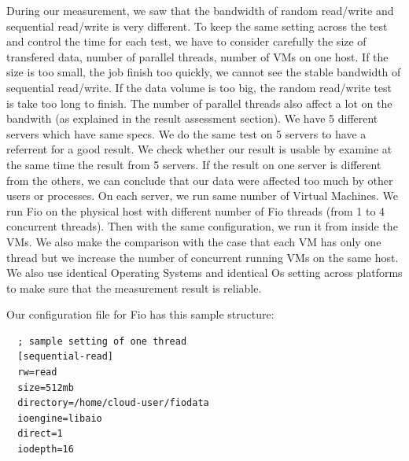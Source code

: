 \documentclass{acmsig}
\newcommand{\noteby}[2]{\todo[inline]{#2\hspace*{\fill}\mbox{ --#1}}}
\begin{document}
\noteby{sh}{Insert a figure here}

During our measurement, we saw that the bandwidth of random read/write and sequential read/write is very different. To keep the same setting across the test and control the time for each test, we have to consider carefully the size of transfered data, number of parallel threads, number of VMs on one host. If the size is too small, the job finish too quickly, we cannot see the stable bandwidth of sequential read/write. If the data volume is too big, the random read/write test is take too long to finish. The number of parallel threads also affect a lot on the bandwith (as explained in the result assessment section). We have 5 different servers which have same specs. We do the same test on 5 servers to have a referrent for a good result. We check whether our result is usable by examine at the same time the result from 5 servers. If the result on one server is different from the others, we can conclude that our data were affected too much by other users or processes. On each server, we run same number of Virtual Machines. We run Fio on the physical host with different number of Fio threads (from 1 to 4 concurrent threads). Then with the same configuration, we run it from inside the VMs. We also make the comparison with the case that each VM has only one thread but we increase the number of concurrent running VMs on the same host. We also use identical Operating Systems and identical Os setting across platforms to make sure that the measurement result is reliable.

Our configuration file for Fio has this sample structure:
\begin{lstlisting}
  ; sample setting of one thread
  [sequential-read]
  rw=read
  size=512mb
  directory=/home/cloud-user/fiodata
  ioengine=libaio
  direct=1
  iodepth=16
\end{lstlisting}
\end{document}
